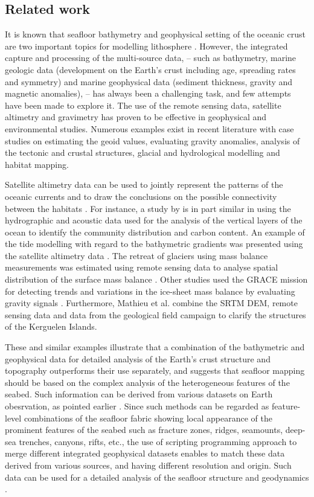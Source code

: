 \documentclass[geomatics,article,submit,pdftex,moreauthors]{Definitions/mdpi}
\begin{document}
\subsection{Related work}

It is known that seafloor bathymetry and geophysical setting of the oceanic crust are two important topics for modelling lithosphere \cite{WATSON201697}. However, the integrated capture and processing of the multi-source data, -- such as bathymetry, marine geologic data (development on the Earth's crust including age, spreading rates and symmetry) and marine geophysical data (sediment thickness, gravity and magnetic anomalies), -- has always been a challenging task, and few attempts have been made to explore it. The use of the remote sensing data, satellite altimetry and gravimetry has proven to be effective in geophysical and environmental studies. Numerous examples exist in recent literature with case studies on estimating the geoid values, evaluating gravity anomalies, analysis of the tectonic and crustal structures, glacial and hydrological modelling and habitat mapping. 

Satellite altimetry data can be used to jointly represent the patterns of the oceanic currents and to draw the conclusions on the possible connectivity between the habitats \cite{MORI201645}. For instance, a study by \cite{COTTE2022103650} is in part similar in using the hydrographic and acoustic data used for the analysis of the vertical layers of the ocean to identify the community distribution and carbon content. An example of the tide modelling with regard to the bathymetric gradients was presented using the satellite altimetry data \cite{Maraldi}. The retreat of glaciers using mass balance measurements was estimated using remote sensing data to analyse spatial distribution of the surface mass balance \cite{Verfaillie}. Other studies used the GRACE mission for detecting trends and variations in the ice-sheet mass balance by evaluating gravity signals \cite{YAMAMOTO2008267}. Furthermore, Mathieu et al. \cite{MATHIEU2011206} combine the SRTM DEM, remote sensing data and data from the geological field campaign to clarify the structures of the Kerguelen Islands. 

These and similar examples illustrate that a combination of the bathymetric and geophysical data for detailed analysis of the Earth's crust structure and topography outperforms their use separately, and suggests that seafloor mapping should be based on the complex analysis of the heterogeneous features of the seabed. Such information can be derived from various datasets on Earth obesrvation, as pointed earlier \cite{COWLEY2004267,Lemenkova202125,1993A234,ABUAMARAH2019868}. Since such methods can be regarded as feature-level combinations of the seafloor fabric showing local appearance of the prominent features of the seabed such as fracture zones, ridges, seamounts, deep-sea trenches, canyons, rifts, etc., the use of scripting programming approach to merge different integrated geophysical datasets enables to match these data derived from various sources, and having different resolution and origin. Such data can be used for a detailed analysis of the seafloor structure and geodynamics \cite{Veevers1991b,Lemenkova202104,Hill}. 
\end{document}

